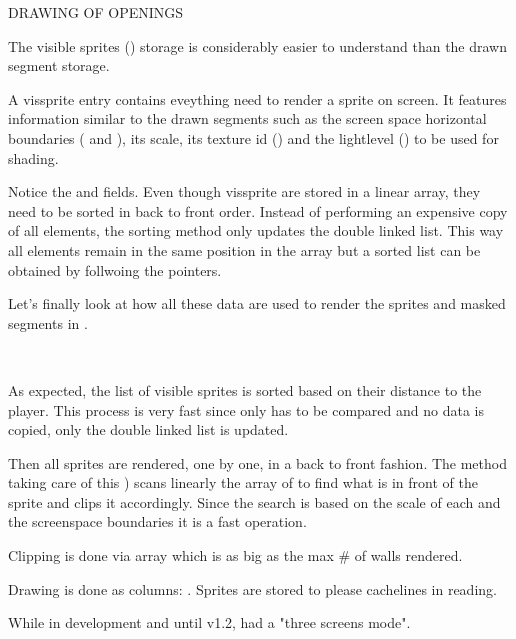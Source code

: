 \par
DRAWING OF OPENINGS\\
\vspace{4.5cm}
\par
The visible sprites () storage is considerably easier to understand than the drawn segment storage.\\
\par
{}
\par
A vissprite entry contains eveything need to render a sprite on screen. It features information similar to the drawn segments such as the screen space horizontal boundaries ( and ), its scale, its texture id () and the lightlevel () to be used for shading.\\
\par
Notice the  and  fields. Even though vissprite are stored in a linear array, they need to be sorted in back to front order. Instead of performing an expensive copy of all elements, the sorting method only updates the double linked list. This way all elements remain in the same position in the array but a sorted list can be obtained by follwoing the  pointers.\\
\par

Let's finally look at how all these data are used to render the sprites and masked segments in .\\
\par
{}\\
\par
As expected, the list of visible sprites is sorted based on their distance to the player. This process is very fast since only  has to be compared and no data is copied, only the double linked list is updated.\\
\par
Then all sprites are rendered, one by one, in a back to front fashion. The method taking care of this ) scans linearly the array of  to find what is in front of the sprite and clips it accordingly. Since the search is based on the scale of each  and the screenspace  boundaries it is a fast operation. 



Clipping is done via  array which is as big as the max \# of walls rendered.\\
\par
Drawing is done as columns: . Sprites are stored to please cachelines in reading.\\
\par
While in development and until v1.2, \doom had a "three screens mode".\\
\par
{}




